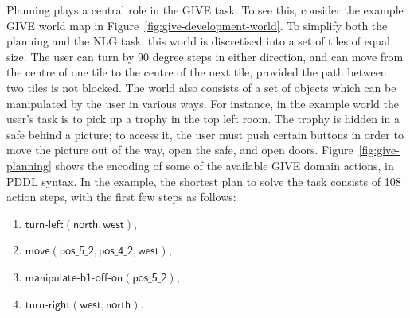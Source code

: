 Planning plays a central role in the GIVE task. To see this, consider
the example GIVE world map in
Figure~\ref{fig:give-development-world}. To simplify both the planning
and the NLG task, this world is discretised into a set of tiles of
equal size.  The user can turn by 90 degree steps in either direction,
and can move from the centre of one tile to the centre of the next
tile, provided the path between two tiles is not blocked. The world
also consists of a set of objects which can be manipulated by the user
in various ways. For instance, in the example world the user's task is
to pick up a trophy in the top left room. The trophy is hidden in a
safe behind a picture; to access it, the user must push certain
buttons in order to move the picture out of the way, open the safe,
and open doors. Figure~\ref{fig:give-planning} shows the encoding of
some of the available GIVE domain actions, in PDDL syntax. In the
example, the shortest plan to solve the task consists of 108 action
steps, with the first few steps as follows:
%
\begin{enumerate}
\item $\mathsf{turn}\textsf{-}\mathsf{left}(\mathsf{north},
\mathsf{west})$,
\item $\mathsf{move}(\mathsf{pos\_5\_2}, \mathsf{pos\_4\_2}, \mathsf{west})$,
\item $\mathsf{manipulate}\textsf{-}\mathsf{b1}\textsf{-}\mathsf{off}\textsf{-}\mathsf{on}(\mathsf{pos\_5\_2})$,
\item $\mathsf{turn}\textsf{-}\mathsf{right}(\mathsf{west}, \mathsf{north})$.
\end{enumerate}

